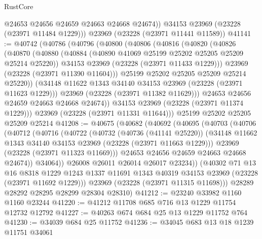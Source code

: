 \begin{lexlean}{RustCore}
\begin{coremodule}
          @24653
          @24656
          @24659
          @24663
          @24668
          @24674))
      @34153
      @23969
      (@23228 (@23971 @11484 @1229)))
    @23969
    (@23228 (@23971 @11441 @11589))
@41141 := @40742
    (@40786
      (@40796
        (@40800
          (@40806
            (@40816
              (@40820
                (@40826
                  (@40870
                    (@40880
                      (@40884 (@40890 @41069 @25199 @25202 @25205 @25209 @25214 @25220))
                      @34153
                      @23969
                      (@23228 (@23971 @11433 @1229)))
                    @23969
                    (@23228 (@23971 @11390 @11604)))
                  @25199
                  @25202
                  @25205
                  @25209
                  @25214
                  @25220))
              (@34148 @11622 @1343 @34140 @34153 @23969 (@23228 (@23971 @11623 @1229)))
              @23969
              (@23228 (@23971 @11382 @11629)))
            @24653
            @24656
            @24659
            @24663
            @24668
            @24674))
        @34153
        @23969
        (@23228 (@23971 @11374 @1229)))
      @23969
      (@23228 (@23971 @11331 @11644)))
    @25199
    @25202
    @25205
    @25209
    @25214
@41208 := @40675
    (@40682
      (@40692
        (@40695
          (@40703
            (@40706
              (@40712
                (@40716
                  (@40722
                    (@40732
                      (@40736 (@41141 @25220))
                      (@34148 @11662 @1343 @34140 @34153 @23969 (@23228 (@23971 @11663 @1229)))
                      @23969
                      (@23228 (@23971 @11323 @11669)))
                    @24653
                    @24656
                    @24659
                    @24663
                    @24668
                    @24674))
                @34064))
            @26008
            @26011
            @26014
            @26017
            @23234))
        (@40302
          @71
          @13
          @16
          @8318
          @1229
          @1243
          @1337
          @11691
          @1343
          @40319
          @34153
          @23969
          (@23228 (@23971 @11692 @1229)))
        @23969
        (@23228 (@23971 @11315 @11698)))
      @28289
      @28292
      @28295
      @28299
      @28304
      @28310)
@41212 := @23240 @33982 @1160 @1160 @23244
@41220 := @41212 @11708 @685 @716 @13 @1229 @11754 @12732 @12792
@41227 := @40263 @674 @684 @25 @13 @1229 @11752 @764
@41230 := @34039 @684 @25 @11752
@41236 := @34045 @683 @13 @18 @1239 @11751 @34061

\end{coremodule}
\end{lexlean}
